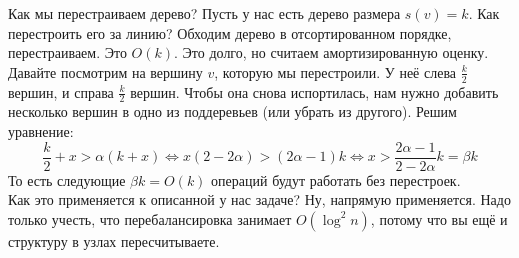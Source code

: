 \documentclass{article}
\begin{document}
\begin{figure}[H]
    \end{figure}\noindent
    Как мы перестраиваем дерево? Пусть у нас есть дерево размера $s(v)=k$. Как перестроить его за линию? Обходим дерево в отсортированном порядке, перестраиваем. Это $O(k)$. Это долго, но считаем амортизированную оценку. Давайте посмотрим на вершину $v$, которую мы перестроили. У неё слева $\frac k2$ вершин, и справа $\frac k2$ вершин. Чтобы она снова испортилась, нам нужно добавить несколько вершин в одно из поддеревьев (или убрать из другого). Решим уравнение:
    $$
    \frac k2+x>\alpha(k+x)\Leftrightarrow x(2-2\alpha)>(2\alpha-1)k\Leftrightarrow x>\frac{2\alpha-1}{2-2\alpha}k=\beta k
    $$
    То есть следующие $\beta k=O(k)$ операций будут работать без перестроек.\\
    Как это применяется к описанной у нас задаче? Ну, напрямую применяется. Надо только учесть, что перебалансировка занимает $O(\log^2n)$, потому что вы ещё и структуру в узлах пересчитываете.
\end{document}
